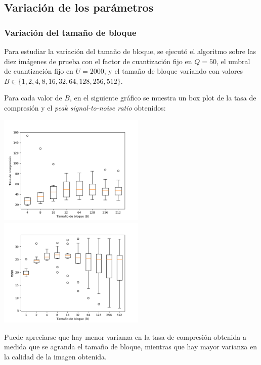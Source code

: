 \documentclass{article}
\newcommand{\set}[1]{\{#1\}}
\begin{document}
\subsection{Variación de los parámetros}

\subsubsection{Variación del tamaño de bloque}
\label{sec:variacion_tam_bloque}

Para estudiar la variación del tamaño de bloque, se ejecutó el
algoritmo sobre las diez imágenes de prueba con el
factor de cuantización fijo en $Q = 50$,
el umbral de cuantización fijo en $U = 2000$,
y el tamaño de bloque variando con valores
$B \in \set{1,2,4,8,16,32,64,128,256,512}$.

Para cada valor de $B$, en el siguiente gráfico se muestra un
box plot de la tasa de compresión y el
{\em peak signal-to-noise ratio} obtenidos:\\
\begin{center}
\includegraphics[width=7cm]{../imgs/output/gray_plots/b_rate.png}
\includegraphics[width=7cm]{../imgs/output/gray_plots/b_psnr.png}
\end{center}

Puede apreciarse que hay menor varianza en la tasa de compresión
obtenida a medida que se agranda el tamaño de bloque,
mientras que hay mayor varianza en la calidad de la imagen obtenida.
\end{document}

